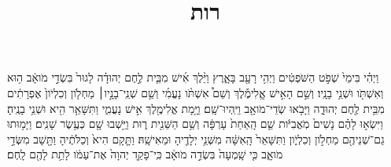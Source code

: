 \documentclass{openreader}
\title{רות}
\date{}
\begin{document}
\maketitle
\raggedbottom 
\fontsize{16pt}{24pt}\selectfont


וַיְהִ֗י בִּימֵי֙ שְׁפֹ֣ט הַשֹּׁפְטִ֔ים וַיְהִ֥י רָעָ֖ב בָּאָ֑רֶץ וַיֵּ֨לֶךְ אִ֜ישׁ מִבֵּ֧ית לֶ֣חֶם יְהוּדָ֗ה לָגוּר֙ בִּשְׂדֵ֣י מֹואָ֔ב ה֥וּא וְאִשְׁתֹּ֖ו וּשְׁנֵ֥י בָנָֽיו׃ 
וְשֵׁ֣ם הָאִ֣ישׁ אֱֽלִימֶ֡לֶךְ וְשֵׁם֩ אִשְׁתֹּ֨ו נָעֳמִ֜י וְשֵׁ֥ם שְׁנֵֽי־בָנָ֣יו׀ מַחְלֹ֤ון וְכִלְיֹון֙ אֶפְרָתִ֔ים מִבֵּ֥ית לֶ֖חֶם יְהוּדָ֑ה וַיָּבֹ֥אוּ שְׂדֵי־מֹואָ֖ב וַיִּֽהְיוּ־שָֽׁם׃ 
וַיָּ֥מָת אֱלִימֶ֖לֶךְ אִ֣ישׁ נָעֳמִ֑י וַתִּשָּׁאֵ֥ר הִ֖יא וּשְׁנֵ֥י בָנֶֽיהָ׃ 
וַיִּשְׂא֣וּ לָהֶ֗ם נָשִׁים֙ מֹֽאֲבִיֹּ֔ות שֵׁ֤ם הָֽאַחַת֙ עָרְפָּ֔ה וְשֵׁ֥ם הַשֵּׁנִ֖ית ר֑וּת וַיֵּ֥שְׁבוּ שָׁ֖ם כְּעֶ֥שֶׂר שָׁנִֽים׃ 
וַיָּמ֥וּתוּ גַם־שְׁנֵיהֶ֖ם מַחְלֹ֣ון וְכִלְיֹ֑ון וַתִּשָּׁאֵר֙ הָֽאִשָּׁ֔ה מִשְּׁנֵ֥י יְלָדֶ֖יהָ וּמֵאִישָֽׁהּ׃ 
וַתָּ֤קָם הִיא֙ וְכַלֹּתֶ֔יהָ וַתָּ֖שָׁב מִשְּׂדֵ֣י מֹואָ֑ב כִּ֤י שָֽׁמְעָה֙ בִּשְׂדֵ֣ה מֹואָ֔ב כִּֽי־פָקַ֤ד יְהוָה֙ אֶת־עַמֹּ֔ו לָתֵ֥ת לָהֶ֖ם לָֽחֶם׃ 
\end{document}
